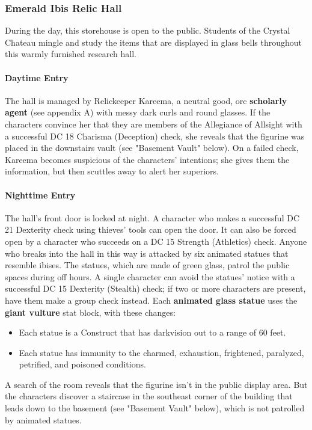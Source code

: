 \documentclass[10pt,a4,twoside,twocolumn,openany,nodeprecatedcode]{dndbook}
\begin{document}
\subsubsection{Emerald Ibis Relic Hall}
During the day, this storehouse is open to the public. Students of the Crystal Chateau mingle and study the items that are displayed in glass bells throughout this warmly furnished research hall.
\paragraph{Daytime Entry}
The hall is managed by Relickeeper Kareema, a neutral good, orc \textbf{scholarly agent} (see appendix A) with messy dark curls and round glasses. If the characters convince her that they are members of the Allegiance of Allsight with a successful DC 18 Charisma (Deception) check, she reveals that the figurine was placed in the downstairs vault (see "Basement Vault" below). On a failed check, Kareema becomes suspicious of the characters' intentions; she gives them the information, but then scuttles away to alert her superiors.
\paragraph{Nighttime Entry}
The hall's front door is locked at night. A character who makes a successful DC 21 Dexterity check using thieves' tools can open the door. It can also be forced open by a character who succeeds on a DC 15 Strength (Athletics) check. Anyone who breaks into the hall in this way is attacked by six animated statues that resemble ibises. The statues, which are made of green glass, patrol the public spaces during off hours. A single character can avoid the statues' notice with a successful DC 15 Dexterity (Stealth) check; if two or more characters are present, have them make a group check instead.
Each \textbf{animated glass statue} uses the \textbf{giant vulture} stat block, with these changes:
\begin{itemize}

\item Each statue is a Construct that has darkvision out to a range of 60 feet.
\item Each statue has immunity to the charmed, exhaustion, frightened, paralyzed, petrified, and poisoned conditions.
\end{itemize}


A search of the room reveals that the figurine isn't in the public display area. But the characters discover a staircase in the southeast corner of the building that leads down to the basement (see "Basement Vault" below), which is not patrolled by animated statues.
\end{document}
